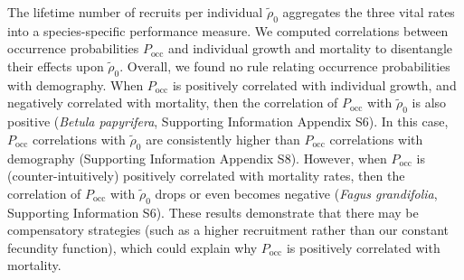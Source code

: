 The lifetime number of recruits per individual $ \tilde \rho_0 $ aggregates the three vital rates into a species-specific performance measure. We computed correlations between occurrence probabilities $ P_{\text{occ}} $ and individual growth and mortality to disentangle their effects upon $ \tilde \rho_0 $. Overall, we found no rule relating occurrence probabilities with demography. When $ P_{\text{occ}} $ is positively correlated with individual growth, and negatively correlated with mortality, then the correlation of $ P_{\text{occ}} $ with $ \tilde \rho_0 $ is also positive (\eg \textit{Betula papyrifera}, Supporting Information Appendix S6). In this case, $ P_{\text{occ}} $ correlations with $ \tilde \rho_0 $ are consistently higher than $ P_{\text{occ}} $ correlations with demography (Supporting Information Appendix S8). However, when $ P_{\text{occ}} $ is (counter-intuitively) positively correlated with mortality rates, then the correlation of $ P_{\text{occ}} $ with $ \tilde \rho_0 $ drops or even becomes negative (\eg \textit{Fagus grandifolia}, Supporting Information S6). These results demonstrate that there may be compensatory strategies (such as a higher recruitment rather than our constant fecundity function), which could explain why $ P_{\text{occ}} $ is positively correlated with mortality.
